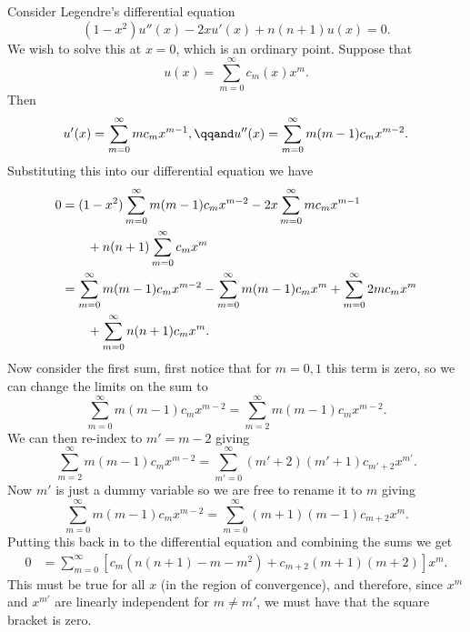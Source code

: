 \documentclass[fleqn]{NotesClass}
\begin{document}
    Consider Legendre's differential equation
    \begin{equation}
        (1 - x^2)u''(x) - 2xu'(x) + n(n + 1)u(x) = 0.
    \end{equation}
    We wish to solve this at \(x = 0\), which is an ordinary point.
    Suppose that
    \begin{equation}
        u(x) = \sum_{m=0}^{\infty} c_m(x) x^m.
    \end{equation}
    Then
    \begin{equation}
        u'(x) = \sum_{m=0}^{\infty} mc_mx^{m-1}, \qqand u''(x) = \sum_{m=0}^{\infty} m(m - 1)c_mx^{m - 2}.
    \end{equation}
    Substituting this into our differential equation we have
    \begin{align}
        0 &= (1 - x^2) \sum_{m=0}^{\infty} m(m - 1)c_mx^{m-2} - 2x\sum_{m=0}^{\infty} mc_mx^{m-1}\notag\\
        &\qquad+ n(n + 1) \sum_{m=0}^{\infty} c_mx^m\\
        &= \sum_{m=0}^{\infty} m(m - 1)c_mx^{m-2} - \sum_{m=0}^{\infty} m(m - 1)c_mx^{m} + \sum_{m=0}^{\infty}2mc_mx^{m}\notag\\
        &\qquad+ \sum_{m=0}^{\infty}n(n+1) c_mx^m.
    \end{align}
    Now consider the first sum, first notice that for \(m = 0, 1\) this term is zero, so we can change the limits on the sum to
    \begin{equation}
        \sum_{m=0}^{\infty} m(m - 1) c_mx^{m-2} = \sum_{m=2}^{\infty} m(m - 1) c_mx^{m-2}.
    \end{equation}
    We can then re-index to \(m' = m - 2\) giving
    \begin{equation}
        \sum_{m=2}^{\infty} m(m-1)c_mx^{m-2} = \sum_{m'=0}^{\infty} (m' + 2)(m' + 1)c_{m' + 2}x^{m'}.
    \end{equation}
    Now \(m'\) is just a dummy variable so we are free to rename it to \(m\) giving
    \begin{equation}
        \sum_{m=0}^{\infty} m(m - 1) c_{m}x^{m-2} = \sum_{m=0}^{\infty} (m + 1)(m - 1)c_{m+2}x^{m}.
    \end{equation}
    Putting this back in to the differential equation and combining the sums we get
    \begin{align}
        0 &= \sum_{m=0}^{\infty} [c_m(n(n + 1) - m - m^2) + c_{m+2}(m + 1)(m + 2)]x^m.
    \end{align}
    This must be true for all \(x\) (in the region of convergence), and therefore, since \(x^m\) and \(x^{m'}\) are linearly independent for \(m \ne m'\), we must have that the square bracket is zero.
\end{document}
